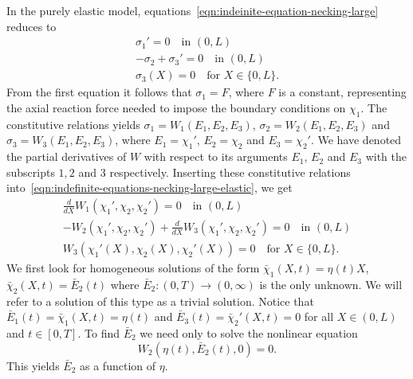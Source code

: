 \documentclass[a4paper,10pt,oneside]{amsbook}
\numberwithin{section}{chapter}
\numberwithin{equation}{chapter}
\theoremstyle{definition}
\begin{document}
In the purely elastic model, equations~\eqref{eqn:indeinite-equation-necking-large} reduces to
\begin{subequations}
\label{eqn:indefinite-equations-necking-large-elastic}
\begin{gather}
\sigma_1'=0\quad\text{in $(0,L)$} \\
-\sigma_2+\sigma_3'=0\quad\text{in $(0,L)$} \\
\sigma_3(X)=0\quad\text{for $X\in\{0,L\}$}.
\end{gather}
\end{subequations}
From the first equation it follows that $\sigma_1=F$, where $F$ is a constant, representing the axial reaction force needed to impose the boundary conditions on $\chi_1$. The constitutive relations yields $\sigma_1=W_1(E_1,E_2,E_3)$, $\sigma_2=W_2(E_1,E_2,E_3)$ and $\sigma_3=W_3(E_1,E_2,E_3)$, where $E_1=\chi_1'$, $E_2=\chi_2$ and $E_3=\chi_2'$. We have denoted the partial derivatives of $W$ with respect to its arguments $E_1$, $E_2$ and $E_3$ with the subscripts $1,2$ and $3$ respectively. Inserting these constitutive relations into~\eqref{eqn:indefinite-equations-necking-large-elastic}, we get
\begin{subequations}
\label{eqn:definite-equations-necking-large-elastic}
\begin{gather}
\frac{d}{dX}W_1(\chi_1',\chi_2,\chi_2')=0\quad\text{in $(0,L)$} \\
-W_2(\chi_1',\chi_2,\chi_2')+\frac{d}{dX}W_3(\chi_1',\chi_2,\chi_2')=0\quad\text{in $(0,L)$} \\
W_3(\chi_1'(X),\chi_2(X),\chi_2'(X))=0\quad\text{for $X\in\{0,L\}$}.
\end{gather}
\end{subequations}
We first look for homogeneous solutions of the form $\bar{\chi}_1(X,t)=\eta(t)X$, $\bar\chi_2(X,t)=\bar E_2(t)$ where $\bar E_2\colon(0,T)\to(0,\infty)$ is the only unknown. We will refer to a solution of this type as a trivial solution. Notice that $\bar E_1(t)=\bar\chi_1(X,t)=\eta(t)$ and $\bar E_3(t)=\bar\chi_2'(X,t)=0$ for all $X\in(0,L)$ and $t\in[0,T]$. To find $\bar E_2$ we need only to solve the nonlinear equation
\[
W_2(\eta(t),\bar E_2(t),0)=0.
\]
This yields $\bar E_2$ as a function of $\eta$.
\end{document}
